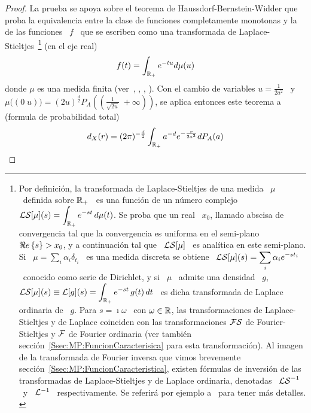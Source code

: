 \begin{proof}
  La prueba se apoya sobre el teorema de Haussdorf-Bernstein-Widder que proba la
  equivalencia entre la  clase de funciones completamente monotonas  y la de las
  funciones   \   $f$   \   que   se   escriben   como   una   transformada   de
  Laplace-Stieltjes~\footnote{Por     definici\'on,    la     transformada    de
    Laplace-Stieltjes de una medida \ $\mu$  \ definida sobre $\mathbb{R}_+$ \ es una
    funci\'on   de  un   n\'umero  complejo   \  $\displaystyle   \mathcal{LS}[\mu](s)  =
    \int_{\mathbb{R}_+} e^{-s t}  \, d\mu(t)$. Se proba que un  real \ $x_0$, llamado
    abscisa de convergencia tal que la convergencia es uniforma en el semi-plano
    \ $\Re e \left\{ s \right\} > x_0$, y a  continuaci\'on tal que \ $\displaystyle \mathcal{LS}[\mu]$ \
    es  anal\'itica  en este  semi-plano.   Si  \  $\displaystyle \mu  =  \sum_i
    \alpha_i \delta_{t_i}$ \ es una  medida discreta se obtiene \ $\displaystyle
    \mathcal{LS}[\mu](s)  =  \sum_i  \alpha_i  e^{-s  t_i}$  \  conocido  como  serie  de
    Dirichlet,  y  si  \ $\mu$  \  admite  una  densidad \  $g$,  $\displaystyle
    \mathcal{LS}[\mu](s) \equiv  \mathcal{L}[g](s) = \int_{\mathbb{R}_+} e^{-s  t} \, g(t) \,  dt$ \ es
    dicha transformada de Laplace ordinaria de  \ $g$.  Para $s = \imath \omega$
    \ con  $\omega \in  \mathbb{R}$, las transformaciones  de Laplace-Stieltjes  y de
    Laplace coinciden con las transformaciones $\mathcal{FS}$ de Fourier-Stieltjes y $\mathcal{F}$
    de           Fourier            ordinaria           (ver           tambi\'en
    secci\'on~\ref{Ssec:MP:FuncionCaracterisica} para esta transformaci\'on). Al
    imagen  de   la  transformada  de  Fourier  inversa   que  vimos  brevemente
    secci\'on~\ref{Ssec:MP:FuncionCaracteristica},    existen    f\'ormulas   de
    inversi\'on  de   las  transformadas  de  Laplace-Stieltjes   y  de  Laplace
    ordinaria, denotadas  \ $\mathcal{LS}^{-1}$  \ y \  $\mathcal{L}^{-1}$ \  respectivamente.  Se
    referir\'a     por    ejemplo     a~\cite{Wid46}     para    tener     m\'as
    detalles. \label{Foot:MP:LaplaceStieltjes}} (en el eje real)
  \[
  f(t) = \int_{\mathbb{R}_+} e^{-t u} d\mu(u)
  \]
  donde  $\mu$  es  una  medida finita  (ver~\cite[Teo.~3]{Sch38},  \cite{Ber29,
    Haus21:I, Haus21:II,  Wid32}, \cite[\S~12]{Wid46}, \cite[\S~XIII.4]{Fel71}).
  Con el  cambio de variables  $u = \frac{1}{2  a^2}$ \ y  \ $\mu\big( (0  \; u)
  \big) =  (2 u)^{\frac{d}{2}} P_A\left( \left( \frac{1}{\sqrt{2  u}} \; +\infty
    \right) \right)$,  se aplica entonces este teorema  a (formula de probabilidad
  total)
  \[
  d_X(r)  =  (2 \pi)^{-\frac{d}{2}} \int_{\mathbb{R}_+} a^{-d} e^{-\frac{r}{2 a^2}} dP_A(a) 
  \]


\end{proof}
